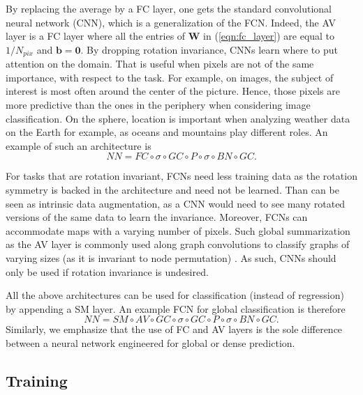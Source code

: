 \documentclass[final,twocolumn,3p,times,sort&compress]{elsarticle}
\newcommand{\eqnref}[1]{(\ref{eqn:#1})}
\renewcommand{\b}[1]{{\bm{#1}}}   %
\newcommand{\1}{\b{1}}              %
\newcommand{\0}{\b{0}}              %
\newcommand{\W}{\b{W}}
\begin{document}
By replacing the average by a FC layer, one gets the standard convolutional neural network (CNN), which is a generalization of the FCN.
Indeed, the AV layer is a FC layer where all the entries of $\W$ in \eqnref{fc_layer} are equal to $1/N_{pix}$ and $\b b = \b 0$.
By dropping rotation invariance, CNNs learn where to put attention on the domain.
That is useful when pixels are not of the same importance, with respect to the task.
For example, on images, the subject of interest is most often around the center of the picture.
Hence, those pixels are more predictive than the ones in the periphery when considering image classification.
On the sphere, location is important when analyzing weather data on the Earth for example, as oceans and mountains play different roles.
An example of such an architecture is
\begin{equation*}
	NN = FC \circ \sigma \circ GC \circ P \circ \sigma \circ BN \circ GC.
\end{equation*}

For tasks that are rotation invariant, FCNs need less training data as the rotation symmetry is backed in the architecture and need not be learned.
Than can be seen as intrinsic data augmentation, as a CNN would need to see many rotated versions of the same data to learn the invariance.
Moreover, FCNs can accommodate maps with a varying number of pixels.
Such global summarization as the AV layer is commonly used along graph convolutions to classify graphs of varying sizes (as it is invariant to node permutation) \citep{duvenaud2015gcn, li2015gatedgnn}.
As such, CNNs should only be used if rotation invariance is undesired.

All the above architectures can be used for classification (instead of regression) by appending a SM layer.
An example FCN for global classification is therefore
\begin{equation*}
	NN = SM \circ AV \circ GC \circ \sigma \circ GC \circ P \circ \sigma \circ BN \circ GC.
\end{equation*}
Similarly, we emphasize that the use of FC and AV layers is the sole difference between a neural network engineered for global or dense prediction.

\subsection{Training}
\end{document}
